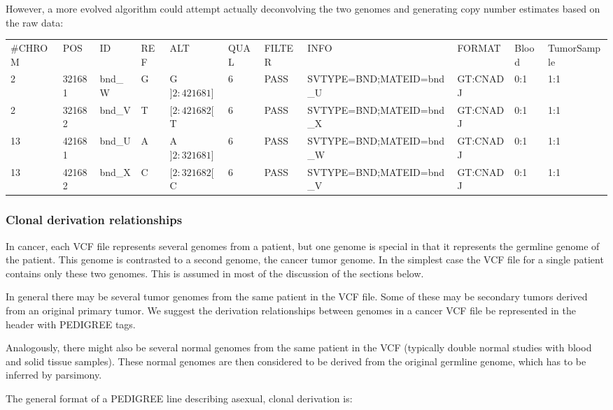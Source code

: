 \documentclass[8pt]{article}
\begin{document}
However, a more evolved algorithm could attempt actually deconvolving the two genomes and generating copy number estimates based on the raw data:

\vspace{0.3cm}
\tiny
\begin{flushleft}
\begin{tabular}{ l l l l l l l l l l l }
\#CHROM & POS & ID & REF & ALT & QUAL & FILTER & INFO & FORMAT & Blood & TumorSample \\
2 & 321681 & bnd\_W & G & G$]2:421681]$ & 6 & PASS & SVTYPE=BND;MATEID=bnd\_U & GT:CNADJ & 0:1 & 1:1 \\
2 & 321682 & bnd\_V & T & $[2:421682[$T & 6 & PASS & SVTYPE=BND;MATEID=bnd\_X & GT:CNADJ & 0:1 & 1:1 \\
13 & 421681 & bnd\_U & A & A$]2:321681]$ & 6 & PASS & SVTYPE=BND;MATEID=bnd\_W & GT:CNADJ & 0:1 & 1:1 \\
13 & 421682 & bnd\_X & C & $[2:321682[$C & 6 & PASS & SVTYPE=BND;MATEID=bnd\_V & GT:CNADJ & 0:1 & 1:1 \\
\end{tabular}
\end{flushleft}
\normalsize

\subsubsection{Clonal derivation relationships}
\label{PedigreeInDetail}
In cancer, each VCF file represents several genomes from a patient, but one genome is special in that it represents the germline genome of the patient. This genome is contrasted to a second genome, the cancer tumor genome. In the simplest case the VCF file for a single patient contains only these two genomes. This is assumed in most of the discussion of the sections below.

In general there may be several tumor genomes from the same patient in the VCF file. Some of these may be secondary tumors derived from an original primary tumor. We suggest the derivation relationships between genomes in a cancer VCF file be represented in the header with PEDIGREE tags.

Analogously, there might also be several normal genomes from the same patient in the VCF (typically double normal studies with blood and solid tissue samples). These normal genomes are then considered to be derived from the original germline genome, which has to be inferred by parsimony.

The general format of a PEDIGREE line describing asexual, clonal derivation is:
\end{document}

